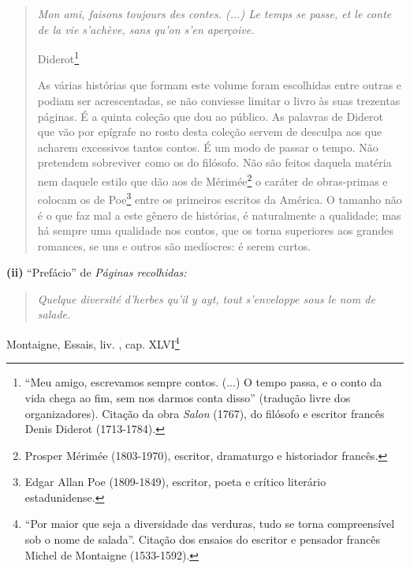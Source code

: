 \begin{quote}
\emph{Mon ami, faisons toujours des contes. (...) Le temps se passe, et
le conte de la vie s'achève, sans qu'on s'en aperçoive. }

Diderot\footnote{``Meu amigo, escrevamos sempre contos. (...) O tempo
  passa, e o conto da vida chega ao fim, sem nos darmos conta disso''
  (tradução livre dos organizadores). Citação da obra \emph{Salon}
  (1767), do filósofo e escritor francês Denis Diderot (1713-1784).}

As várias histórias que formam este volume foram escolhidas entre outras
e podiam ser acrescentadas, se não conviesse limitar o livro às suas
trezentas páginas. É a quinta coleção que dou ao público. As palavras de
Diderot que vão por epígrafe no rosto desta coleção servem de desculpa
aos que acharem excessivos tantos contos. É um modo de passar o tempo.
Não pretendem sobreviver como os do filósofo. Não são feitos daquela
matéria nem daquele estilo que dão aos de Mérimée\footnote{Prosper
  Mérimée (1803-1970), escritor, dramaturgo e historiador francês.} o
caráter de obras-primas e colocam os de Poe\footnote{Edgar Allan Poe
  (1809-1849), escritor, poeta e crítico literário estadunidense.} entre
os primeiros escritos da América. O tamanho não é o que faz mal a este
gênero de histórias, é naturalmente a qualidade; mas há sempre uma
qualidade nos contos, que os torna superiores aos grandes romances, se
uns e outros são medíocres: é serem curtos.
\end{quote}

\textbf{(ii)} ``Prefácio'' de \emph{Páginas recolhidas: }

\begin{quote}
\emph{Quelque diversité d'herbes qu'il y ayt, tout s'enveloppe sous le
nom de salade. }
\end{quote}

Montaigne, Essais, liv. , cap. XLVI\footnote{``Por maior que seja a
  diversidade das verduras, tudo se torna compreensível sob o nome de
  salada''. Citação dos ensaios do escritor e pensador francês Michel de
  Montaigne (1533-1592).}

